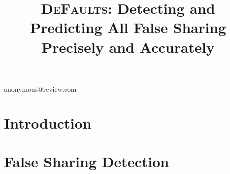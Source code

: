 \documentclass[9pt]{sigplanconf}
\date{} %
\newcommand{\DeFaults}{{\scshape DeFaults}}
\begin{document}


\title{\DeFaults{}: Detecting and Predicting All False Sharing Precisely and Accurately}
           {anonymous@review.com}

\maketitle

\begin{abstract}

\end{abstract}

\begin{comment}
\category{CR-number}{subcategory}{third-level}

\terms
term1, term2

\keywords
keyword1, keyword2
\end{comment}

\section{Introduction}



\section{False Sharing Detection}

\end{document}
